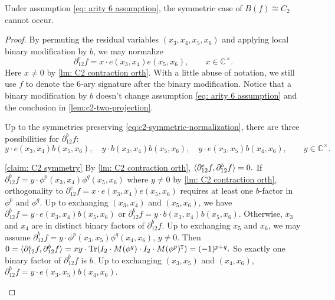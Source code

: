 \begin{lemma}\label{lm: C2 symmetric impossible}
    Under assumption \eqref{eq: arity 6 assumption}, the symmetric case of $B(f)\cong C_2$ cannot occur.
\end{lemma}
\begin{proof}
    
    By permuting the residual variables $(x_3,x_4,x_5,x_6)$ and applying local binary modification by $b$, we may normalize
    \begin{equation}
         \partial_{12}^{e}f=x\cdot e(x_3,x_4)e(x_5,x_6),
         \qquad x\in\mathbb C^\times.
         \label{eq:c2-symmetric-normalization}
    \end{equation}
    Here $x\neq 0$ by \cref{lm: C2 contraction orth}.
    With a little abuse of notation, we still use $f$ to denote the 6-ary signature after the binary modification.
    Notice that a binary modification by $b$ doesn't change assumption \eqref{eq: arity 6 assumption} and the conclusion in \cref{lem:c2-two-projection}.
    \begin{claim}\label{claim: C2 symmetry}
        Up to the symmetries preserving \eqref{eq:c2-symmetric-normalization}, there are three possibilities for $\partial_{12}^{b}f$:
        \[
         y\cdot e(x_3,x_4)b(x_5,x_6),\quad
         y\cdot b(x_3,x_4)b(x_5,x_6),\quad
         y\cdot e(x_3,x_5)b(x_4,x_6),
         \qquad y\in\mathbb C^\times.
        \]
    \end{claim}
    \begin{claimproof}{\cref{claim: C2 symmetry}}
        By \cref{lm: C2 contraction orth}, $\braket{\partial_{12}^{e}f,\partial_{12}^{b}f}=0.$
        If $\partial_{12}^bf=y\cdot \phi^p(x_3,x_4)\phi^q(x_5,x_6)$ where $y\neq 0$ by \cref{lm: C2 contraction orth}, orthogonality to \(\partial_{12}^{e}f=x\cdot e(x_3,x_4)e(x_5,x_6)\) requires at least one \(b\)-factor in $\phi^p$ and $\phi^q$. 
        Up to exchanging $(x_3,x_4)$ and $(x_5,x_6)$, we have $\partial_{12}^bf=y\cdot e(x_3,x_4)b(x_5,x_6)$ or $\partial_{12}^bf= y\cdot b(x_3,x_4)b(x_5,x_6).$
        Otherwise, $x_3$ and $x_4$ are in distinct binary factors of $\partial_{12}^bf$.
        Up to exchanging $x_5$ and $x_6$, we may assume
        $\partial_{12}^bf=y\cdot \phi^p(x_3,x_5)\phi^q(x_4,x_6), \,y\ne 0.$
        Then $0=\braket{\partial_{12}^ef,\partial_{12}^bf}=xy\cdot\mathrm{Tr}(I_2\cdot M(\phi^q)\cdot I_2\cdot M(\phi^p)^{\tt T})=(-1)^{p+q}.$
        So exactly one binary factor of $\partial_{12}^bf$ is $b$.
        Up to exchanging $(x_3,x_5)$ and $(x_4,x_6)$, $\partial_{12}^bf=y\cdot e(x_3,x_5)b(x_4,x_6).$
    \end{claimproof}
    

\end{proof}

